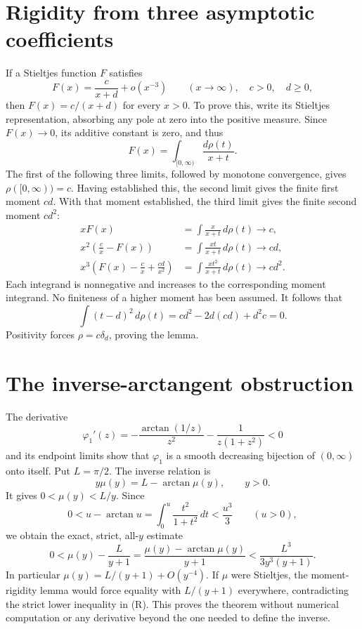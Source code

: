 \documentclass[11pt,a4paper]{article}
\begin{document}
\section{Rigidity from three asymptotic coefficients}
If a Stieltjes function $F$ satisfies
\[
 F(x)=\frac{c}{x+d}+o(x^{-3})\qquad(x\to\infty),
 \quad c>0,\quad d\ge0,
\]
then $F(x)=c/(x+d)$ for every $x>0$.
To prove this, write its Stieltjes representation, absorbing any pole
at zero into the positive measure. Since $F(x)\to0$, its additive
constant is zero, and thus
\[
 F(x)=\int_{[0,\infty)}\frac{d\rho(t)}{x+t}.
\]
The first of the following three limits, followed by monotone
convergence, gives $\rho([0,\infty))=c$. Having established this,
the second limit gives the finite first moment $cd$. With that
moment established, the third limit gives the finite second moment
$cd^2$:
\begin{align*}
 xF(x)&=\int\frac{x}{x+t}\,d\rho(t)\longrightarrow c,\\
 x^2\left(\frac c x-F(x)\right)
 &=\int\frac{xt}{x+t}\,d\rho(t)\longrightarrow cd,\\
 x^3\left(F(x)-\frac c x+\frac{cd}{x^2}\right)
 &=\int\frac{xt^2}{x+t}\,d\rho(t)\longrightarrow cd^2.
\end{align*}
Each integrand is nonnegative and increases to the corresponding
moment integrand. No finiteness of a higher moment has been assumed.
It follows that
\[
 \int(t-d)^2\,d\rho(t)=cd^2-2d(cd)+d^2c=0.
\]
Positivity forces $\rho=c\delta_d$, proving the lemma.

\section{The inverse-arctangent obstruction}
The derivative
\[
 \varphi_1'(z)
 =-\frac{\arctan(1/z)}{z^2}-\frac1{z(1+z^2)}<0
\]
and its endpoint limits show that $\varphi_1$ is a smooth decreasing
bijection of $(0,\infty)$ onto itself. Put $L=\pi/2$. The inverse
relation is
\[
 y\mu(y)=L-\arctan\mu(y),\qquad y>0.
\]
It gives $0<\mu(y)<L/y$. Since
\[
 0<u-\arctan u=\int_0^u\frac{t^2}{1+t^2}\,dt<\frac{u^3}{3}
 \qquad(u>0),
\]
we obtain the exact, strict, all-$y$ estimate
\begin{equation}
 0<\mu(y)-\frac{L}{y+1}
   =\frac{\mu(y)-\arctan\mu(y)}{y+1}
   <\frac{L^3}{3y^3(y+1)}. \tag{R}
\end{equation}
In particular $\mu(y)=L/(y+1)+O(y^{-4})$. If $\mu$ were
Stieltjes, the moment-rigidity lemma would force equality with
$L/(y+1)$ everywhere, contradicting the strict lower inequality
in (R). This proves the theorem without numerical computation or
any derivative beyond the one needed to define the inverse.
\end{document}
